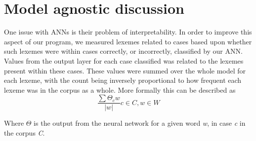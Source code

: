 \section{Model agnostic discussion}
\label{section:model-agnostic-explanation}





One issue with ANNs is their problem of interpretability. In order to improve this aspect of our program, we measured lexemes related to cases based upon whether such lexemes were within cases correctly, or incorrectly, classified by our ANN. Values from the output layer for each case classified was related to the lexemes present within these cases. These values were summed over the whole model for each lexeme, with the count being inversely proportional to how frequent each lexeme was in the corpus as a whole. More formally this can be described as
\begin{equation}
\frac{\sum \Theta_cw}{|w|} c \in C, w \in W
\end{equation}

Where $\Theta$ is the output from the neural network for a given word \textit{w}, in case \textit{c} in the corpus \textit{C}. 





